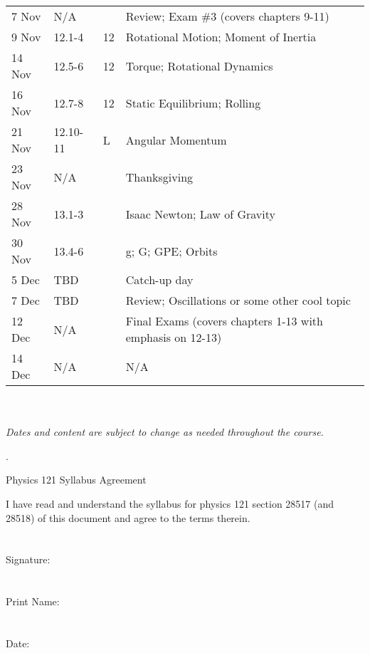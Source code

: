 \documentclass[12pt]{article}
\begin{document}
\begin{tabu}{llll}
\rowfont{\color{red}}
7 Nov    & N/A       &        & Review; Exam \#3 (covers chapters 9-11) \\
9 Nov    & 12.1-4    & 12     & Rotational Motion; Moment of Inertia \\
14 Nov   & 12.5-6    & 12     & Torque; Rotational Dynamics \\
16 Nov   & 12.7-8    & 12     & Static Equilibrium; Rolling \\
21 Nov   & 12.10-11  & L      & Angular Momentum \\
23 Nov   & N/A       &        & Thanksgiving \\
28 Nov   & 13.1-3    &        & Isaac Newton; Law of Gravity \\
30 Nov   & 13.4-6    &        & g; G; GPE; Orbits \\
5 Dec    & TBD       &        & Catch-up day \\
7 Dec    & TBD       &        & Review; Oscillations or some other cool topic \\
\rowfont{\color{red}}
12 Dec   & N/A       &        & Final Exams (covers chapters 1-13 with emphasis on 12-13)\\
14 Dec   & N/A       &        & N/A
\end{tabu}
\\~\\
{\it *Dates and content are subject to change as needed throughout the course.}

\newpage
.
\newpage
\begin{center}
{\Huge Physics 121 Syllabus Agreement}
\end{center}
I have read and understand the syllabus for physics 121 section 28517 (and 28518) of this document and agree to the terms therein.
\\~\\~\\
Signature: \hrulefill \hspace*{0mm}\phantom{Approved: }
\\~\\~\\
Print Name: \hrulefill \hspace*{0mm}\phantom{Approved: }
\\~\\~\\
Date: \hrulefill \hspace*{0mm}\phantom{Approved: }
\end{document}
